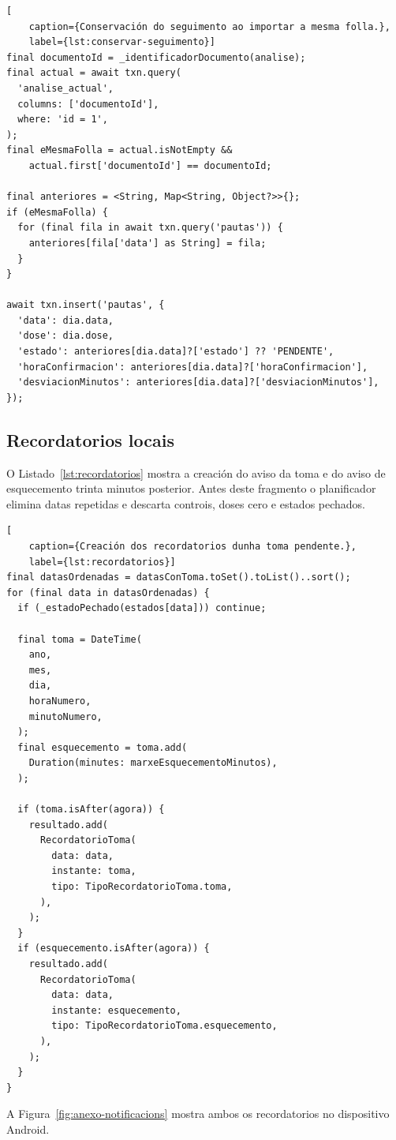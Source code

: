 \begin{lstlisting}[
    caption={Conservación do seguimento ao importar a mesma folla.},
    label={lst:conservar-seguimento}]
final documentoId = _identificadorDocumento(analise);
final actual = await txn.query(
  'analise_actual',
  columns: ['documentoId'],
  where: 'id = 1',
);
final eMesmaFolla = actual.isNotEmpty &&
    actual.first['documentoId'] == documentoId;

final anteriores = <String, Map<String, Object?>>{};
if (eMesmaFolla) {
  for (final fila in await txn.query('pautas')) {
    anteriores[fila['data'] as String] = fila;
  }
}

await txn.insert('pautas', {
  'data': dia.data,
  'dose': dia.dose,
  'estado': anteriores[dia.data]?['estado'] ?? 'PENDENTE',
  'horaConfirmacion': anteriores[dia.data]?['horaConfirmacion'],
  'desviacionMinutos': anteriores[dia.data]?['desviacionMinutos'],
});
\end{lstlisting}

\subsection{Recordatorios locais}

O Listado~\ref{lst:recordatorios} mostra a creación do aviso da toma e do aviso
de esquecemento trinta minutos posterior. Antes deste fragmento o planificador
elimina datas repetidas e descarta controis, doses cero e estados pechados. 

\begin{lstlisting}[
    caption={Creación dos recordatorios dunha toma pendente.},
    label={lst:recordatorios}]
final datasOrdenadas = datasConToma.toSet().toList()..sort();
for (final data in datasOrdenadas) {
  if (_estadoPechado(estados[data])) continue;

  final toma = DateTime(
    ano,
    mes,
    dia,
    horaNumero,
    minutoNumero,
  );
  final esquecemento = toma.add(
    Duration(minutes: marxeEsquecementoMinutos),
  );

  if (toma.isAfter(agora)) {
    resultado.add(
      RecordatorioToma(
        data: data,
        instante: toma,
        tipo: TipoRecordatorioToma.toma,
      ),
    );
  }
  if (esquecemento.isAfter(agora)) {
    resultado.add(
      RecordatorioToma(
        data: data,
        instante: esquecemento,
        tipo: TipoRecordatorioToma.esquecemento,
      ),
    );
  }
}
\end{lstlisting}

A Figura~\ref{fig:anexo-notificacions} mostra ambos os recordatorios no dispositivo Android.


